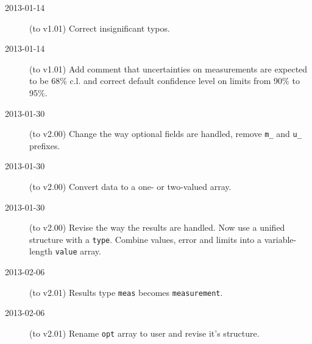 \documentclass[11pt, letterpaper]{article}
\begin{document}
\begin{description}
  \item[2013-01-14] (to v1.01) Correct insignificant typos.
  \item[2013-01-14] (to v1.01) Add comment that uncertainties on measurements are expected to be 68\% c.l. and correct default confidence level on limits from 90\% to 95\%.
    \item[2013-01-30] (to v2.00) Change the way optional fields are handled, remove \texttt{m\_} and \texttt{u\_} prefixes.
    \item[2013-01-30] (to v2.00) Convert data to a one- or two-valued array.
    \item[2013-01-30] (to v2.00) Revise the way the results are handled. Now use a unified structure with a \texttt{type}. Combine values, error and limits into a variable-length \texttt{value} array.
    \item[2013-02-06] (to v2.01) Results type \texttt{meas} becomes \texttt{measurement}.
    \item[2013-02-06] (to v2.01) Rename \texttt{opt} array to user and revise it's structure.
\end{description}
\end{document}

